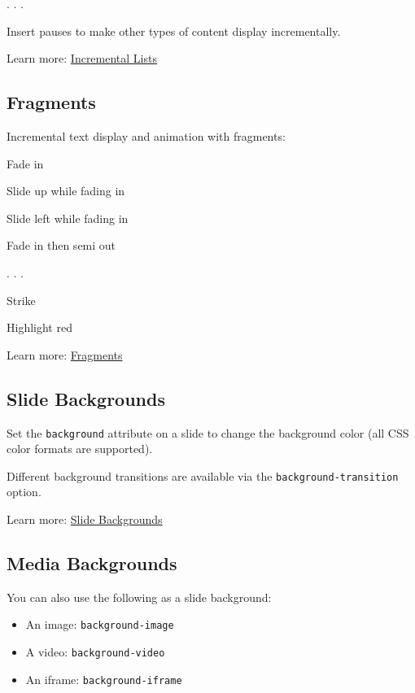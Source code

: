 \documentclass[
  letterpaper,
  DIV=11,
  numbers=noendperiod]{scrartcl}
\begin{document}
. . .

Insert pauses to make other types of content display incrementally.

Learn more:
\href{https://?meta:prerelease-subdomainquarto.org/docs/presentations/revealjs/\#incremental-lists}{Incremental
Lists}

\subsection{Fragments}\label{fragments}

Incremental text display and animation with fragments:

Fade in

Slide up while fading in

Slide left while fading in

Fade in then semi out

. . .

Strike

Highlight red

Learn more:
\href{https://?meta:prerelease-subdomainquarto.org/docs/presentations/revealjs/advanced.html\#fragments}{Fragments}

\subsection{Slide Backgrounds}\label{slide-backgrounds}

Set the \texttt{background} attribute on a slide to change the
background color (all CSS color formats are supported).

Different background transitions are available via the
\texttt{background-transition} option.

Learn more:
\href{https://?meta:prerelease-subdomainquarto.org/docs/presentations/revealjs/\#color-backgrounds}{Slide
Backgrounds}

\subsection{Media Backgrounds}\label{media-backgrounds}

You can also use the following as a slide background:

\begin{itemize}
\item
  An image: \texttt{background-image}
\item
  A video: \texttt{background-video}
\item
  An iframe: \texttt{background-iframe}
\end{itemize}
\end{document}
